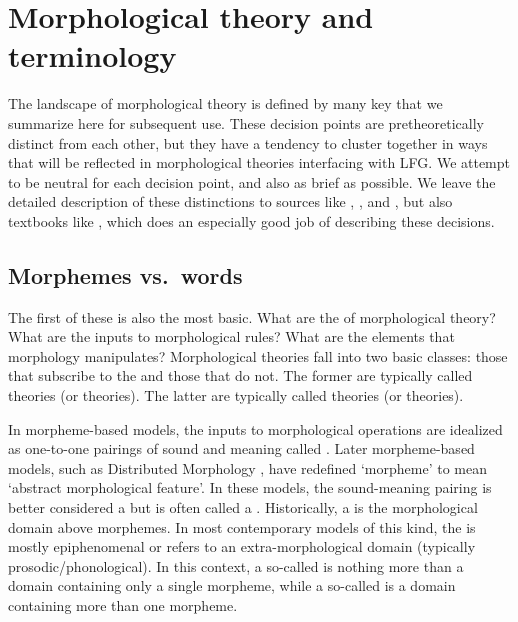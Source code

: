 \documentclass[output=paper,hidelinks]{langscibook}
\begin{document}
\section{Morphological theory and terminology}
\label{sec:Morph:morph-theory}

The landscape of morphological theory is defined by many key  that we summarize here for subsequent use.  These decision
points are pretheoretically distinct from each other, but they have a
tendency to cluster together in ways that will be reflected in
morphological theories interfacing with LFG.  We attempt to be neutral
for each decision point, and also as brief as possible.  We leave the
detailed description of these distinctions to sources like
\citet{hockett54}, \citet{beard95}, and \citet{Stu01}, but also textbooks like
\citet{haspelmath;sims10}, which does an especially good job of
describing these decisions.

\subsection{Morphemes vs.\ words}
\label{sec:Morph:morphemes-vs-words}

The first of these is also the most basic.  What are the
 of morphological theory?  What are the inputs to
morphological rules?  What are the elements that morphology
manipulates?  Morphological theories fall into two basic classes:
those that subscribe to the  and those that
do not.  The former are typically called  theories (or
 theories). The latter are typically called
 theories (or  theories).

\begin{sloppypar}
  In morpheme-based models, the inputs to morphological operations are
  idealized as one-to-one pairings of sound and meaning called
  .  Later mor\-pheme-based models, such as
  Distributed Morphology \citep{hallemarantz}, have redefined
  `morpheme' to mean `abstract morphological feature'.
  In these models, the sound-meaning pairing is better considered a
   \citep{disciullo:word} but is often called a
  .  Historically, a  is the
  morphological domain above morphemes.  In most contemporary models
  of this kind, the  is mostly epiphenomenal or refers to
  an extra-morphological domain (typically prosodic/phonological).  In
  this context, a so-called  is nothing more than
  a domain containing only a single morpheme, while a
  so-called  is a domain containing more than one
  morpheme.
\end{sloppypar}
\end{document}
